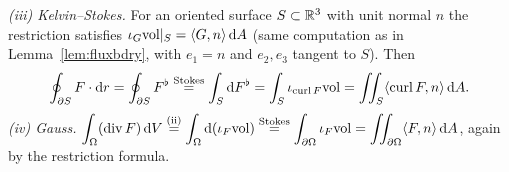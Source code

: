 \emph{(iii) Kelvin--Stokes.} For an oriented surface $S\subset\mathbb{R}^3$ with unit normal $n$ the restriction satisfies $\iota_G\mathrm{vol}|_S=\langle G,n\rangle\,\mathrm{d} A$ (same computation as in Lemma~\ref{lem:fluxbdry}, with $e_1=n$ and $e_2,e_3$ tangent to $S$). Then
\[
\oint_{\partial S}F\cdot\mathrm{d} r=\oint_{\partial S}F^\flat\overset{\text{Stokes}}=\int_S\mathrm{d} F^\flat=\int_S\iota_{\operatorname{curl}F}\mathrm{vol}=\iint_S\langle\operatorname{curl}F,n\rangle\,\mathrm{d} A .
\]
\emph{(iv) Gauss.} $\displaystyle\int_\Omega(\operatorname{div}F)\,\mathrm{d} V\overset{\text{(ii)}}=\int_\Omega\mathrm{d}(\iota_F\mathrm{vol})\overset{\text{Stokes}}=\int_{\partial\Omega}\iota_F\mathrm{vol}=\iint_{\partial\Omega}\langle F,n\rangle\,\mathrm{d} A$, again by the restriction formula.
